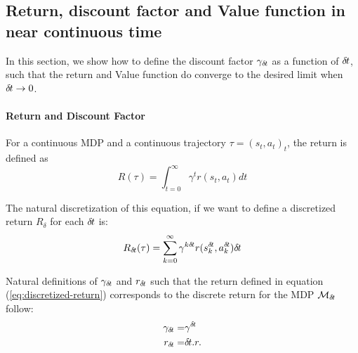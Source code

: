 \subsection{Return, discount factor  and Value function in near continuous time}
\label{sec:ret-gamma-v}

In this section, we show how to define the discount factor $\gamma_{\delta\hspace{-.1em}t}$ as a function of ${\delta\hspace{-.1em}t}$, such that the return and Value function do converge to the desired limit when ${\delta\hspace{-.1em}t} \rightarrow 0$. 


\paragraph{Return and Discount Factor}
For a continuous MDP and a continuous trajectory $\tau = (s_t, a_t)_t$,
the return is defined as~\cite{cont_rl}
\begin{equation}
	\label{eq:continuous-return}
	R(\tau) = \int_{t=0}^\infty\gamma^tr(s_t, a_t)dt
\end{equation}

The natural discretization of this equation, if we want to define a discretized
return $R_\delta$ for each ${\delta\hspace{-.1em}t}$ is:
\begin{equation}
	\label{eq:discretized-return}
	R_{\delta\hspace{-.1em}t}(\tau) = \sum_{k=0}^\infty\gamma^{k{\delta\hspace{-.1em}t}}
	r(s^{\delta\hspace{-.1em}t}_k, a^{\delta\hspace{-.1em}t}_k){\delta\hspace{-.1em}t}
\end{equation}

Natural definitions of $\gamma_{\delta\hspace{-.1em}t}$ and $r_{\delta\hspace{-.1em}t}$ such
that the return defined in equation (\ref{eq:discretized-return}) corresponds
to the discrete return for the MDP ${\cal M}_{\delta\hspace{-.1em}t}$ follow:
\begin{align}
	\label{eq:def-gamma}
	\gamma_{\delta\hspace{-.1em}t} =& \gamma^{\delta\hspace{-.1em}t}\\
	\label{eq:def-reward}
	r_{\delta\hspace{-.1em}t} =& {\delta\hspace{-.1em}t} . r.
\end{align}


